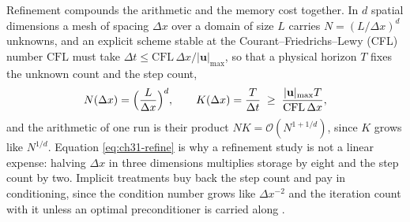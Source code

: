 Refinement compounds the arithmetic and the memory cost together. In $d$ spatial dimensions a
mesh of spacing $\Delta x$ over a
domain of size $L$ carries $N = (L/\Delta x)^{d}$ unknowns, and an explicit scheme stable at the
Courant--Friedrichs--Lewy (CFL) number $\mathrm{CFL}$ must take
$\Delta t \le \mathrm{CFL}\,\Delta x / |\mathbf{u}|_{\max}$, so that a physical horizon
$T$ fixes the unknown count and the step count,
\begin{equation}
  \label{eq:ch31-refine}
  N(\Delta x) = \Bigl(\frac{L}{\Delta x}\Bigr)^{d}, \qquad
  K(\Delta x) = \frac{T}{\Delta t} \;\ge\; \frac{|\mathbf{u}|_{\max} T}{\mathrm{CFL}\,\Delta x},
\end{equation}
and the arithmetic of one run is their product $N K = \mathcal{O}(N^{1+1/d})$, since $K$
grows like $N^{1/d}$.
Equation \eqref{eq:ch31-refine} is why a refinement study is not a
linear expense: halving
$\Delta x$ in three dimensions multiplies storage by eight and the step count by two. Implicit
treatments buy back the step count and pay in conditioning, since the condition number grows
like $\Delta x^{-2}$ and the iteration count with it unless an optimal preconditioner is carried
along
\cite{leveque2002finite, quarteroni2008numerical}.

